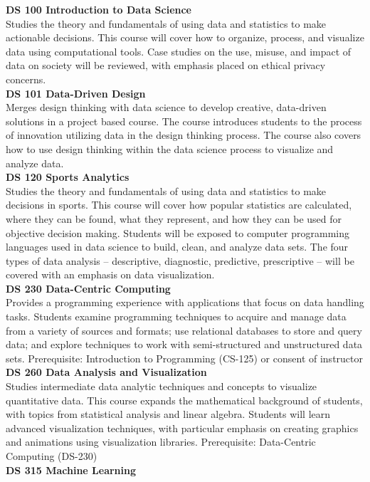\documentclass[
  letterpaper,
]{scrbook}
\begin{document}
\textbf{DS 100 Introduction to Data Science}\\
Studies the theory and fundamentals of using data and statistics to make
actionable decisions. This course will cover how to organize, process,
and visualize data using computational tools. Case studies on the use,
misuse, and impact of data on society will be reviewed, with emphasis
placed on ethical privacy concerns.\\
\textbf{DS 101 Data-Driven Design}\\
Merges design thinking with data science to develop creative,
data-driven solutions in a project based course. The course introduces
students to the process of innovation utilizing data in the design
thinking process. The course also covers how to use design thinking
within the data science process to visualize and analyze data.\\
\textbf{DS 120 Sports Analytics}\\
Studies the theory and fundamentals of using data and statistics to make
decisions in sports. This course will cover how popular statistics are
calculated, where they can be found, what they represent, and how they
can be used for objective decision making. Students will be exposed to
computer programming languages used in data science to build, clean, and
analyze data sets. The four types of data analysis -- descriptive,
diagnostic, predictive, prescriptive -- will be covered with an emphasis
on data visualization.\\
\textbf{DS 230 Data-Centric Computing}\\
Provides a programming experience with applications that focus on data
handling tasks. Students examine programming techniques to acquire and
manage data from a variety of sources and formats; use relational
databases to store and query data; and explore techniques to work with
semi-structured and unstructured data sets. Prerequisite: Introduction
to Programming (CS-125) or consent of instructor\\
\textbf{DS 260 Data Analysis and Visualization}\\
Studies intermediate data analytic techniques and concepts to visualize
quantitative data. This course expands the mathematical background of
students, with topics from statistical analysis and linear algebra.
Students will learn advanced visualization techniques, with particular
emphasis on creating graphics and animations using visualization
libraries. Prerequisite: Data-Centric Computing (DS-230)\\
\textbf{DS 315 Machine Learning}\\
\end{document}
